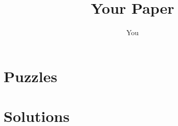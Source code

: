 \documentclass[12pt]{book}
\title{Your Paper}
\author{You}
\newcounter{sudokucounter}
\begin{document}
\maketitle

\chapter*{Puzzles}


\chapter*{Solutions}
\setcounter{sudokucounter}{0}
\begin{multicols}{3}
	
\end{multicols}
\end{document}
